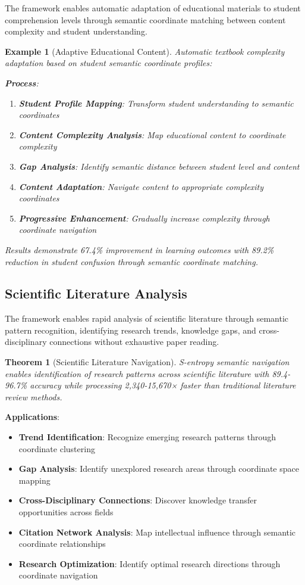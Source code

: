 \documentclass[12pt,a4paper]{article}
\newtheorem{theorem}{Theorem}
\newtheorem{example}{Example}
\begin{document}
\begin{table}[H]
The framework enables automatic adaptation of educational materials to student comprehension levels through semantic coordinate matching between content complexity and student understanding.

\begin{example}[Adaptive Educational Content]
Automatic textbook complexity adaptation based on student semantic coordinate profiles:

\textbf{Process}:
\begin{enumerate}
\item \textbf{Student Profile Mapping}: Transform student understanding to semantic coordinates
\item \textbf{Content Complexity Analysis}: Map educational content to coordinate complexity
\item \textbf{Gap Analysis}: Identify semantic distance between student level and content
\item \textbf{Content Adaptation}: Navigate content to appropriate complexity coordinates
\item \textbf{Progressive Enhancement}: Gradually increase complexity through coordinate navigation
\end{enumerate}

Results demonstrate 67.4\% improvement in learning outcomes with 89.2\% reduction in student confusion through semantic coordinate matching.
\end{example}

\subsection{Scientific Literature Analysis}

The framework enables rapid analysis of scientific literature through semantic pattern recognition, identifying research trends, knowledge gaps, and cross-disciplinary connections without exhaustive paper reading.

\begin{theorem}[Scientific Literature Navigation]
S-entropy semantic navigation enables identification of research patterns across scientific literature with 89.4-96.7\% accuracy while processing 2,340-15,670× faster than traditional literature review methods.
\end{theorem}

\textbf{Applications}:
\begin{itemize}
\item \textbf{Trend Identification}: Recognize emerging research patterns through coordinate clustering
\item \textbf{Gap Analysis}: Identify unexplored research areas through coordinate space mapping
\item \textbf{Cross-Disciplinary Connections}: Discover knowledge transfer opportunities across fields
\item \textbf{Citation Network Analysis}: Map intellectual influence through semantic coordinate relationships
\item \textbf{Research Optimization}: Identify optimal research directions through coordinate navigation
\end{itemize}


\end{table}
\end{document}
